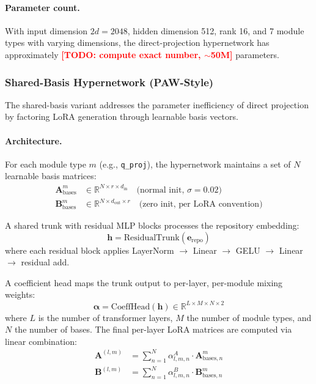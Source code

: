 \documentclass[11pt]{article}
\newcommand{\todo}[1]{\textcolor{red}{\textbf{[TODO: #1]}}}
\begin{document}
\paragraph{Parameter count.}
With input dimension $2d = 2048$, hidden dimension 512, rank 16, and 7 module types with varying dimensions, the direct-projection hypernetwork has approximately \todo{compute exact number, $\sim$50M} parameters.

\subsubsection{Shared-Basis Hypernetwork (PAW-Style)}
\label{sec:paw}

The shared-basis variant addresses the parameter inefficiency of direct projection by factoring LoRA generation through learnable basis vectors.

\paragraph{Architecture.}
For each module type $m$ (e.g., \texttt{q\_proj}), the hypernetwork maintains a set of $N$ learnable basis matrices:
\begin{align}
    \mathbf{A}^m_\text{bases} &\in \mathbb{R}^{N \times r \times d_\text{in}} \quad \text{(normal init, } \sigma = 0.02\text{)} \\
    \mathbf{B}^m_\text{bases} &\in \mathbb{R}^{N \times d_\text{out} \times r} \quad \text{(zero init, per LoRA convention)}
\end{align}

A shared trunk with residual MLP blocks processes the repository embedding:
\begin{equation}
    \mathbf{h} = \text{ResidualTrunk}(\mathbf{e}_\text{repo})
\end{equation}
where each residual block applies LayerNorm $\to$ Linear $\to$ GELU $\to$ Linear $\to$ residual add.

A coefficient head maps the trunk output to per-layer, per-module mixing weights:
\begin{equation}
    \boldsymbol{\alpha} = \text{CoeffHead}(\mathbf{h}) \in \mathbb{R}^{L \times M \times N \times 2}
\end{equation}
where $L$ is the number of transformer layers, $M$ the number of module types, and $N$ the number of bases.
The final per-layer LoRA matrices are computed via linear combination:
\begin{align}
    \mathbf{A}^{(l,m)} &= \sum_{n=1}^{N} \alpha^A_{l,m,n} \cdot \mathbf{A}^m_{\text{bases},n} \\
    \mathbf{B}^{(l,m)} &= \sum_{n=1}^{N} \alpha^B_{l,m,n} \cdot \mathbf{B}^m_{\text{bases},n}
\end{align}
\end{document}
